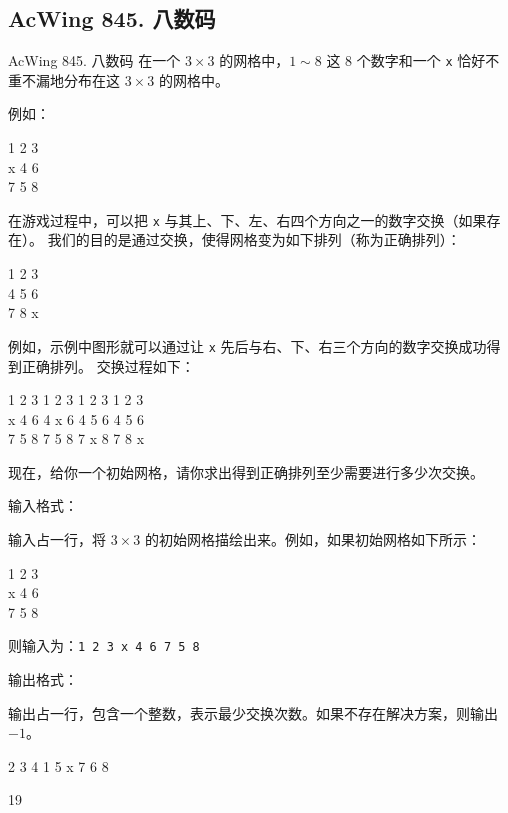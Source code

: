 \subsection{AcWing 845. 八数码}
\begin{titledbox}{AcWing 845. 八数码}
在一个 $3 \times 3$ 的网格中，$1 \sim 8$ 这 $8$ 个数字和一个 \lstinline{x} 恰好不重不漏地分布在这 $3 \times 3$ 的网格中。

例如：

1 2 3 \\
x 4 6 \\
7 5 8

在游戏过程中，可以把 \lstinline{x} 与其上、下、左、右四个方向之一的数字交换（如果存在）。
我们的目的是通过交换，使得网格变为如下排列（称为正确排列）：

1 2 3 \\
4 5 6 \\
7 8 x

例如，示例中图形就可以通过让 \lstinline{x} 先后与右、下、右三个方向的数字交换成功得到正确排列。
交换过程如下：

1 2 3 \hspace{1em} 1 2 3 \hspace{1em} 1 2 3 \hspace{1em} 1 2 3 \\
x 4 6 \hspace{1em} 4 x 6 \hspace{1em} 4 5 6 \hspace{1em} 4 5 6 \\
7 5 8 \hspace{1em} 7 5 8 \hspace{1em} 7 x 8 \hspace{1em} 7 8 x

现在，给你一个初始网格，请你求出得到正确排列至少需要进行多少次交换。

输入格式：

输入占一行，将 $3 \times 3$ 的初始网格描绘出来。例如，如果初始网格如下所示：

1 2 3 \\
x 4 6 \\
7 5 8 

则输入为：\lstinline{1 2 3 x 4 6 7 5 8}

输出格式：

输出占一行，包含一个整数，表示最少交换次数。如果不存在解决方案，则输出 $-1$。

\begin{inputblock}
    2  3  4  1  5  x  7  6  8
\end{inputblock}
\begin{outputblock}
    19
\end{outputblock}
\end{titledbox}



